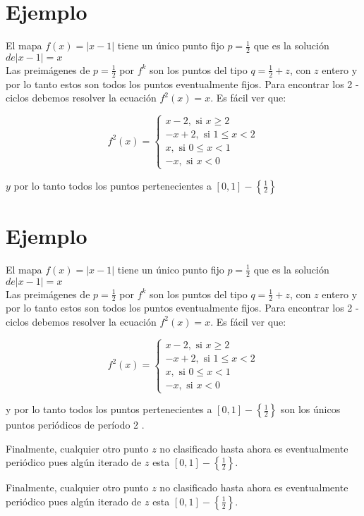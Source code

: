 \documentclass[11pt]{beamer}
\begin{document}
\section*{Ejemplo}
El mapa $f(x)=|x-1|$ tiene un único punto fijo $p=\frac{1}{2}$ que es la solución $d e|x-1|=x$\\
Las preimágenes de $p=\frac{1}{2}$ por $f^{k}$ son los puntos del tipo $q=\frac{1}{2}+z$, con $z$ entero y por lo tanto estos son todos los puntos eventualmente fijos. Para encontrar los 2 - ciclos debemos resolver la ecuación $f^{2}(x)=x$. Es fácil ver que:

$$
f^{2}(x)=\left\{\begin{array}{c}
x-2, \text { si } x \geq 2 \\
-x+2, \text { si } 1 \leq x<2 \\
x, \text { si } 0 \leq x<1 \\
-x, \text { si } x<0
\end{array}\right.
$$

$y$ por lo tanto todos los puntos pertenecientes a $[0,1]-\left\{\frac{1}{2}\right\}$

\section*{Ejemplo}
El mapa $f(x)=|x-1|$ tiene un único punto fijo $p=\frac{1}{2}$ que es la solución $d e|x-1|=x$\\
Las preimágenes de $p=\frac{1}{2}$ por $f^{k}$ son los puntos del tipo $q=\frac{1}{2}+z$, con $z$ entero y por lo tanto estos son todos los puntos eventualmente fijos. Para encontrar los 2 - ciclos debemos resolver la ecuación $f^{2}(x)=x$. Es fácil ver que:

$$
f^{2}(x)=\left\{\begin{array}{c}
x-2, \text { si } x \geq 2 \\
-x+2, \text { si } 1 \leq x<2 \\
x, \text { si } 0 \leq x<1 \\
-x, \text { si } x<0
\end{array}\right.
$$

y por lo tanto todos los puntos pertenecientes a $[0,1]-\left\{\frac{1}{2}\right\}$ son los únicos puntos periódicos de período 2 .

Finalmente, cualquier otro punto $z$ no clasificado hasta ahora es eventualmente periódico pues algún iterado de $z$ esta $[0,1]-\left\{\frac{1}{2}\right\}$.

Finalmente, cualquier otro punto $z$ no clasificado hasta ahora es eventualmente periódico pues algún iterado de $z$ esta $[0,1]-\left\{\frac{1}{2}\right\}$.
\end{document}
